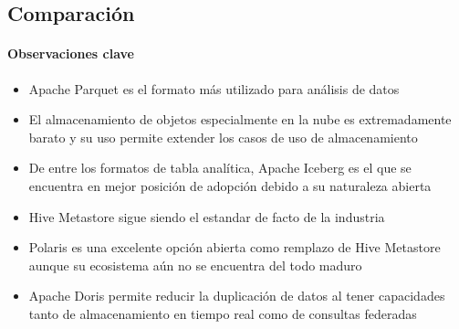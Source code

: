 \newpage

\subsection{Comparación}

\paragraph{Observaciones clave}
\begin{itemize}
    \item Apache Parquet es el formato más utilizado para análisis de datos
    \item El almacenamiento de objetos especialmente en la nube es extremadamente barato y su uso permite extender los casos de uso de almacenamiento
    \item De entre los formatos de tabla analítica, Apache Iceberg es el que se encuentra en mejor posición de adopción debido a su naturaleza abierta
    \item Hive Metastore sigue siendo el estandar de facto de la industria
    \item Polaris es una excelente opción abierta como remplazo de Hive Metastore aunque su ecosistema aún no se encuentra del todo maduro
    \item Apache Doris permite reducir la duplicación de datos al tener capacidades tanto de almacenamiento en tiempo real como de consultas federadas
\end{itemize}
\newpage